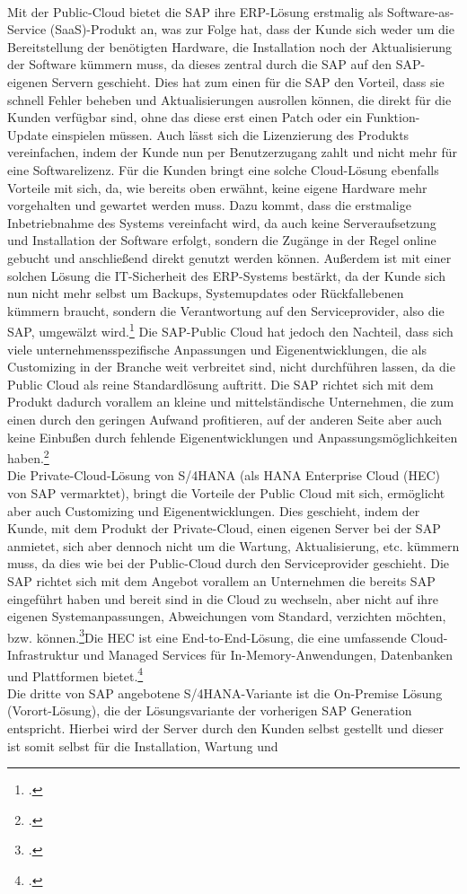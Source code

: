 \\Mit der Public-Cloud bietet die SAP ihre ERP-Lösung erstmalig als Software-as-Service (SaaS)-Produkt an, was zur Folge hat, dass der Kunde sich weder um die Bereitstellung der benötigten Hardware, die Installation noch der Aktualisierung der Software kümmern muss, da dieses zentral durch die SAP auf den SAP-eigenen Servern geschieht. Dies hat zum einen für die SAP den Vorteil, dass sie schnell Fehler beheben und Aktualisierungen ausrollen können, die direkt für die Kunden verfügbar sind, ohne das diese erst einen Patch oder ein Funktion-Update einspielen müssen. Auch lässt sich die Lizenzierung des Produkts vereinfachen, indem der Kunde nun per Benutzerzugang zahlt und nicht mehr für eine Softwarelizenz. Für die Kunden bringt eine solche Cloud-Lösung ebenfalls Vorteile mit sich, da, wie bereits oben erwähnt, keine eigene Hardware mehr vorgehalten und gewartet werden muss. Dazu kommt, dass die erstmalige Inbetriebnahme des Systems vereinfacht wird, da auch keine Serveraufsetzung und Installation der Software erfolgt, sondern die Zugänge in der Regel online gebucht und anschließend direkt genutzt werden können. Außerdem ist mit einer solchen Lösung die IT-Sicherheit des ERP-Systems bestärkt, da der Kunde sich nun nicht mehr selbst um Backups, Systemupdates oder Rückfallebenen kümmern braucht, sondern die Verantwortung auf den Serviceprovider, also die SAP, umgewälzt wird.\footcite[Vgl.][]{saas} Die SAP-Public Cloud hat jedoch den Nachteil, dass sich viele unternehmensspezifische Anpassungen und Eigenentwicklungen, die als \glqq{}Customizing\grqq{} in der Branche weit verbreitet sind, nicht durchführen lassen, da die Public Cloud als reine Standardlösung auftritt. Die SAP richtet sich mit dem Produkt dadurch vorallem an kleine und mittelständische Unternehmen, die zum einen durch den geringen Aufwand profitieren, auf der anderen Seite aber auch keine Einbußen durch fehlende Eigenentwicklungen und Anpassungsmöglichkeiten haben.\footcite[Vgl.][]{rz10-s4hana}\\Die Private-Cloud-Lösung von S/4HANA (als \glqq{}HANA Enterprise Cloud (HEC)\grqq{} von SAP vermarktet), bringt die Vorteile der Public Cloud mit sich, ermöglicht aber auch Customizing und Eigenentwicklungen. Dies geschieht, indem der Kunde, mit dem Produkt der Private-Cloud, einen eigenen Server bei der SAP anmietet, sich aber dennoch nicht um die Wartung, Aktualisierung, etc. kümmern muss, da dies wie bei der Public-Cloud durch den Serviceprovider geschieht. Die SAP richtet sich mit dem Angebot vorallem an Unternehmen die bereits SAP eingeführt haben und bereit sind in die Cloud zu wechseln, aber nicht auf ihre eigenen Systemanpassungen, Abweichungen vom Standard, verzichten möchten, bzw. können.\footcite[Vgl.][]{rz10-hana}\glqq{}Die HEC ist eine End-to-End-Lösung, die eine umfassende Cloud-Infrastruktur und Managed Services für In-Memory-Anwendungen, Datenbanken und Plattformen bietet.\grqq{}\footcite[Vgl.][]{rz10-hana}\\Die dritte von SAP angebotene S/4HANA-Variante ist die On-Premise Lösung (Vorort-Lösung), die der Lösungsvariante der vorherigen SAP Generation entspricht. Hierbei wird der Server durch den Kunden selbst gestellt und dieser ist somit selbst für die Installation, Wartung und 